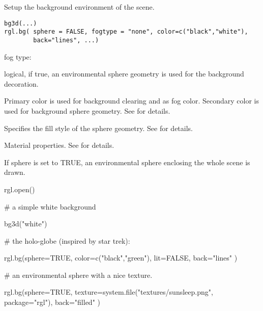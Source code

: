 \documentclass{article}
\begin{document}
\begin{Description}\relax
Setup the background environment of the scene.
\end{Description}
\begin{Usage}
\begin{verbatim}
bg3d(...) 
rgl.bg( sphere = FALSE, fogtype = "none", color=c("black","white"), 
        back="lines", ...)

\end{verbatim}
\end{Usage}
\begin{Arguments}
\begin{ldescription}
\item[\code{fogtype}] fog type:

\item[\code{sphere}] logical, if true, an environmental sphere geometry is used for the background decoration.

\item[\code{color}] Primary color is used for background clearing and as fog color.
Secondary color is used for background sphere geometry. See  for details.

\item[\code{back}] Specifies the fill style of the sphere geometry. See  for details.

\item[\code{ ... }] Material properties. See  for details.
\end{ldescription}
\end{Arguments}
\begin{Details}\relax
If sphere is set to TRUE, an environmental sphere enclosing the whole scene is drawn.
\end{Details}
\begin{SeeAlso}\relax
{}
\end{SeeAlso}
\begin{Examples}
\begin{ExampleCode}
  rgl.open()
  
  # a simple white background
  
  bg3d("white")

  # the holo-globe (inspired by star trek):

  rgl.bg(sphere=TRUE, color=c("black","green"), lit=FALSE, back="lines" )

  # an environmental sphere with a nice texture.

  rgl.bg(sphere=TRUE, texture=system.file("textures/sunsleep.png", package="rgl"), 
         back="filled" )
\end{ExampleCode}
\end{Examples}
\end{document}
